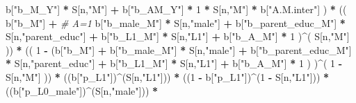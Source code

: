 \documentclass[
]{book}
\newenvironment{Shaded}{\begin{snugshade}}{\end{snugshade}}
\newcommand{\CommentTok}[1]{\textcolor[rgb]{0.56,0.35,0.01}{\textit{#1}}}
\newcommand{\DecValTok}[1]{\textcolor[rgb]{0.00,0.00,0.81}{#1}}
\newcommand{\NormalTok}[1]{#1}
\newcommand{\SpecialCharTok}[1]{\textcolor[rgb]{0.81,0.36,0.00}{\textbf{#1}}}
\newcommand{\StringTok}[1]{\textcolor[rgb]{0.31,0.60,0.02}{#1}}
\begin{document}
\begin{Shaded}
\begin{Highlighting}[]
\NormalTok{                             b[}\StringTok{"b\_M\_Y"}\NormalTok{] }\SpecialCharTok{*}\NormalTok{ S[n,}\StringTok{"M"}\NormalTok{] }\SpecialCharTok{+}
\NormalTok{                             b[}\StringTok{"b\_AM\_Y"}\NormalTok{] }\SpecialCharTok{*} \DecValTok{1} \SpecialCharTok{*}\NormalTok{ S[n,}\StringTok{"M"}\NormalTok{] }\SpecialCharTok{*}\NormalTok{ b[}\StringTok{"A.M.inter"}\NormalTok{] ) }\SpecialCharTok{*}
\NormalTok{      (( b[}\StringTok{"b\_M"}\NormalTok{] }\SpecialCharTok{+}                                                             \CommentTok{\# A\textquotesingle{}=1}
\NormalTok{           b[}\StringTok{"b\_male\_M"}\NormalTok{] }\SpecialCharTok{*}\NormalTok{ S[n,}\StringTok{"male"}\NormalTok{] }\SpecialCharTok{+} 
\NormalTok{           b[}\StringTok{"b\_parent\_educ\_M"}\NormalTok{] }\SpecialCharTok{*}\NormalTok{ S[n,}\StringTok{"parent\_educ"}\NormalTok{] }\SpecialCharTok{+} 
\NormalTok{           b[}\StringTok{"b\_L1\_M"}\NormalTok{] }\SpecialCharTok{*}\NormalTok{ S[n,}\StringTok{"L1"}\NormalTok{] }\SpecialCharTok{+}
\NormalTok{           b[}\StringTok{"b\_A\_M"}\NormalTok{] }\SpecialCharTok{*} \DecValTok{1}\NormalTok{ )}\SpecialCharTok{\^{}}\NormalTok{( S[n,}\StringTok{"M"}\NormalTok{] )) }\SpecialCharTok{*}
\NormalTok{      (( }\DecValTok{1} \SpecialCharTok{{-}}\NormalTok{ (b[}\StringTok{"b\_M"}\NormalTok{] }\SpecialCharTok{+} 
\NormalTok{                b[}\StringTok{"b\_male\_M"}\NormalTok{] }\SpecialCharTok{*}\NormalTok{ S[n,}\StringTok{"male"}\NormalTok{] }\SpecialCharTok{+} 
\NormalTok{                b[}\StringTok{"b\_parent\_educ\_M"}\NormalTok{] }\SpecialCharTok{*}\NormalTok{ S[n,}\StringTok{"parent\_educ"}\NormalTok{] }\SpecialCharTok{+} 
\NormalTok{                b[}\StringTok{"b\_L1\_M"}\NormalTok{] }\SpecialCharTok{*}\NormalTok{ S[n,}\StringTok{"L1"}\NormalTok{] }\SpecialCharTok{+}
\NormalTok{                b[}\StringTok{"b\_A\_M"}\NormalTok{] }\SpecialCharTok{*} \DecValTok{1}\NormalTok{ ) )}\SpecialCharTok{\^{}}\NormalTok{( }\DecValTok{1} \SpecialCharTok{{-}}\NormalTok{ S[n,}\StringTok{"M"}\NormalTok{] )) }\SpecialCharTok{*}
\NormalTok{      ((b[}\StringTok{"p\_L1"}\NormalTok{])}\SpecialCharTok{\^{}}\NormalTok{(S[n,}\StringTok{"L1"}\NormalTok{])) }\SpecialCharTok{*}
\NormalTok{      ((}\DecValTok{1} \SpecialCharTok{{-}}\NormalTok{ b[}\StringTok{"p\_L1"}\NormalTok{])}\SpecialCharTok{\^{}}\NormalTok{(}\DecValTok{1} \SpecialCharTok{{-}}\NormalTok{ S[n,}\StringTok{"L1"}\NormalTok{])) }\SpecialCharTok{*}
\NormalTok{      ((b[}\StringTok{"p\_L0\_male"}\NormalTok{])}\SpecialCharTok{\^{}}\NormalTok{(S[n,}\StringTok{"male"}\NormalTok{])) }\SpecialCharTok{*} 

\end{Highlighting}
\end{Shaded}
\end{document}
